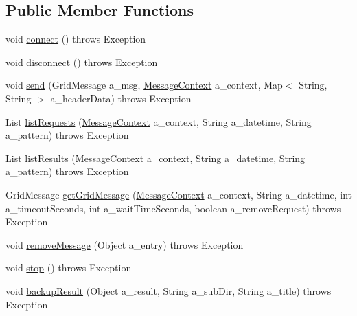 \subsection*{Public Member Functions}
\begin{DoxyCompactItemize}
\item 
void \hyperlink{interfaceorg_1_1jgap_1_1distr_1_1grid_1_1_i_grid_client_mediator_a9c167ee36b2c5c1b1d0c3a73535b4c67}{connect} ()  throws Exception
\item 
void \hyperlink{interfaceorg_1_1jgap_1_1distr_1_1grid_1_1_i_grid_client_mediator_ae0f495c6b3b530c17080176a0ab1bb35}{disconnect} ()  throws Exception
\item 
void \hyperlink{interfaceorg_1_1jgap_1_1distr_1_1grid_1_1_i_grid_client_mediator_affc59251eaf699da84a107ebbf27ed78}{send} (Grid\-Message a\-\_\-msg, \hyperlink{classorg_1_1jgap_1_1distr_1_1grid_1_1_message_context}{Message\-Context} a\-\_\-context, Map$<$ String, String $>$ a\-\_\-header\-Data)  throws Exception
\item 
List \hyperlink{interfaceorg_1_1jgap_1_1distr_1_1grid_1_1_i_grid_client_mediator_a6d3b85a4f42475b5825f924d9ba59eba}{list\-Requests} (\hyperlink{classorg_1_1jgap_1_1distr_1_1grid_1_1_message_context}{Message\-Context} a\-\_\-context, String a\-\_\-datetime, String a\-\_\-pattern)  throws Exception
\item 
List \hyperlink{interfaceorg_1_1jgap_1_1distr_1_1grid_1_1_i_grid_client_mediator_a7499a616fadcee3847e73535799e74a4}{list\-Results} (\hyperlink{classorg_1_1jgap_1_1distr_1_1grid_1_1_message_context}{Message\-Context} a\-\_\-context, String a\-\_\-datetime, String a\-\_\-pattern)  throws Exception
\item 
Grid\-Message \hyperlink{interfaceorg_1_1jgap_1_1distr_1_1grid_1_1_i_grid_client_mediator_a1716e496659e90ae169149fd11ef0637}{get\-Grid\-Message} (\hyperlink{classorg_1_1jgap_1_1distr_1_1grid_1_1_message_context}{Message\-Context} a\-\_\-context, String a\-\_\-datetime, int a\-\_\-timeout\-Seconds, int a\-\_\-wait\-Time\-Seconds, boolean a\-\_\-remove\-Request)  throws Exception
\item 
void \hyperlink{interfaceorg_1_1jgap_1_1distr_1_1grid_1_1_i_grid_client_mediator_ab6b6be3e765dd6b96d44f9d5daa6ffbd}{remove\-Message} (Object a\-\_\-entry)  throws Exception
\item 
void \hyperlink{interfaceorg_1_1jgap_1_1distr_1_1grid_1_1_i_grid_client_mediator_a1754c025617ae00ef9c8905c5b7aa4ec}{stop} ()  throws Exception
\item 
void \hyperlink{interfaceorg_1_1jgap_1_1distr_1_1grid_1_1_i_grid_client_mediator_a811c4a83e3e1cc91e23804f56aafa9a4}{backup\-Result} (Object a\-\_\-result, String a\-\_\-sub\-Dir, String a\-\_\-title)  throws Exception
\end{DoxyCompactItemize}
